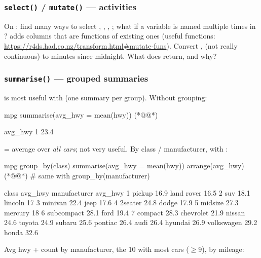 \subsubsection{\texttt{select()} / \texttt{mutate()} --- activities}
%
On : find many ways to select , , , ; what if a variable is named multiple times in ?  adds columns that are functions of existing ones (useful functions: \url{https://r4ds.had.co.nz/transform.html#mutate-funs}). Convert ,  (not really continuous) to minutes since midnight. What does  return, and why?

\subsubsection{\texttt{summarise()} --- grouped summaries}
%
 is most useful with  (one summary per group). Without grouping:
\begin{rcode}
mpg %
  summarise(avg_hwy = mean(hwy)) (*@@*)
\end{rcode}
\begin{routput}
  avg_hwy
1    23.4
\end{routput}
= average over \emph{all cars}; not very useful. By class / manufacturer, with :
\begin{rcode}
mpg %
  group_by(class) %
  summarise(avg_hwy = mean(hwy)) %
  arrange(avg_hwy) (*@@*)
# same with group_by(manufacturer)
\end{rcode}
\begin{routput}
  class      avg_hwy   manufacturer avg_hwy
1 pickup        16.9   land rover      16.5
2 suv           18.1   lincoln         17
3 minivan       22.4   jeep            17.6
4 2seater       24.8   dodge           17.9
5 midsize       27.3   mercury         18
6 subcompact    28.1   ford            19.4
7 compact       28.3   chevrolet       21.9
                       nissan          24.6
                       toyota          24.9
                       subaru          25.6
                       pontiac         26.4
                       audi            26.4
                       hyundai         26.9
                       volkswagen      29.2
                       honda           32.6
\end{routput}
Avg hwy + count by manufacturer, the 10 with most cars ($\ge$9), by mileage:
